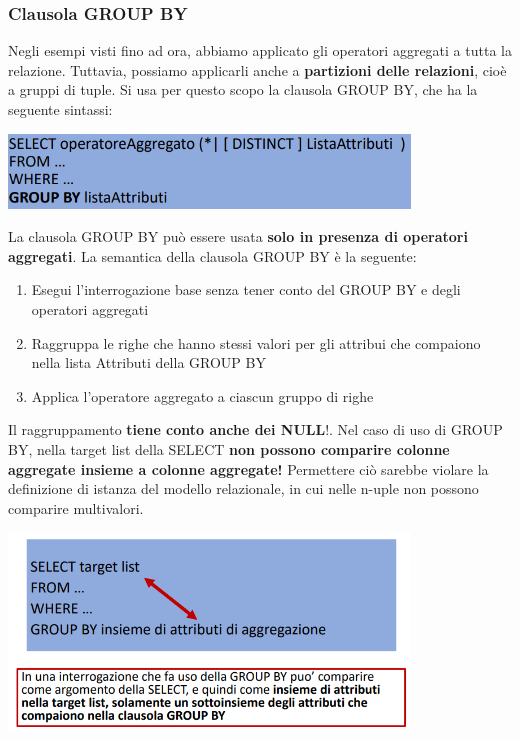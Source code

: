 \documentclass[12pt]{article}
\begin{document}
\subsubsection{Clausola GROUP BY}
Negli esempi visti fino ad ora, abbiamo applicato gli operatori aggregati a tutta la relazione.
Tuttavia, possiamo applicarli anche a \textbf{partizioni delle relazioni}, cioè a gruppi di tuple.
Si usa per questo scopo la clausola GROUP BY, che ha la seguente sintassi:
\begin{center}
    \includegraphics[width = 0.80\textwidth]{Images/216.PNG}
\end{center}
La clausola GROUP BY può essere usata \textbf{solo in presenza di operatori aggregati}.
La semantica della clausola GROUP BY è la seguente:
\begin{enumerate}
    \item Esegui l'interrogazione base senza tener conto del GROUP BY e degli operatori aggregati
    \item Raggruppa le righe che hanno stessi valori per gli attribui che compaiono nella lista Attributi della GROUP BY
    \item Applica l'operatore aggregato a ciascun gruppo di righe
\end{enumerate}
Il raggruppamento \textbf{tiene conto anche dei NULL}!.
Nel caso di uso di GROUP BY, nella target list della SELECT \textbf{non possono comparire colonne aggregate insieme a colonne aggregate!}
Permettere ciò sarebbe violare la definizione di istanza del modello relazionale, in cui nelle n-uple non possono comparire multivalori.
\begin{center}
    \includegraphics[width = 0.80\textwidth]{Images/217.PNG}
\end{center}
\end{document}
